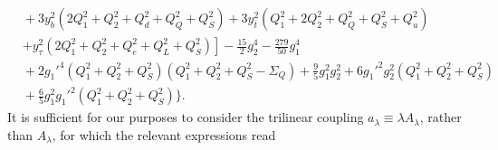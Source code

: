 \documentclass[preprint,amsmath,amssymb,aps,superscriptaddress,prd,showpacs,floatfix,nofootinbib]{revtex4-1}
\begin{document}
\begin{subequations}
\begin{align}
&{}+3y_b^2\left ( 2Q_1^2+Q_2^2+Q_d^2+Q_Q^2+Q_S^2 \right )+3y_t^2\left ( Q_1^2+2Q_2^2+Q_Q^2+Q_S^2+Q_u^2\right )\nonumber\\
&{}\left.+y_\tau^2\left ( 2Q_1^2+Q_2^2+Q_e^2+Q_L^2+Q_S^2\right )\right ]-\frac{15}{2}g_2^4-\frac{279}{50}g_1^4\nonumber\\
&{}+2g_1'^4\left ( Q_1^2+Q_2^2+Q_S^2 \right )\left (Q_1^2+Q_2^2+Q_S^2-\Sigma_{Q}\right )+\frac{9}{5}g_1^2g_2^2+6g_1'^2g_2^2\left ( Q_1^2+Q_2^2+Q_S^2\right )\nonumber\\
&{}+\frac{6}{5}g_1^2g_1'^2\left ( Q_1^2+Q_2^2+Q_S^2 \right ) \bigg \}.\label{eq:USSMLambdaOt2Coeff}
\end{align}
\end{subequations}
It is sufficient for our purposes to consider the trilinear coupling $a_\lambda\equiv \lambda A_\lambda$, rather than $A_\lambda$, for which the relevant expressions read
\end{document}
